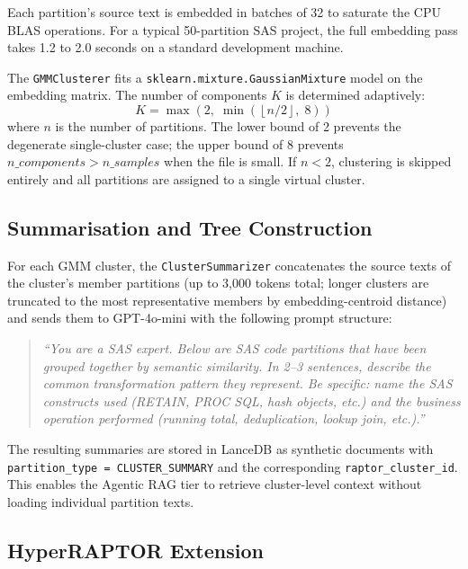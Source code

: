 Each partition's source text is embedded in batches of 32 to saturate the CPU
BLAS operations. For a typical 50-partition SAS project, the full embedding pass
takes 1.2 to 2.0 seconds on a standard development machine.

The \texttt{GMMClusterer} fits a \texttt{sklearn.mixture.GaussianMixture}
model on the embedding matrix. The number of components $K$ is determined
adaptively:
\begin{equation}
  K = \max\!\left(2,\; \min\!\left(\left\lfloor n / 2 \right\rfloor,\; 8\right)\right)
  \label{eq:gmm-k}
\end{equation}
where $n$ is the number of partitions. The lower bound of 2 prevents the
degenerate single-cluster case; the upper bound of 8 prevents
$n\_components > n\_samples$ when the file is small. If $n < 2$, clustering
is skipped entirely and all partitions are assigned to a single virtual cluster.

\subsection{Summarisation and Tree Construction}
\label{subsec:summarizer-impl}

For each GMM cluster, the \texttt{ClusterSummarizer} concatenates the source
texts of the cluster's member partitions (up to 3,000 tokens total; longer
clusters are truncated to the most representative members by embedding-centroid
distance) and sends them to GPT-4o-mini with the following prompt structure:

\begin{quotation}
\textit{``You are a SAS expert. Below are SAS code partitions that have been
grouped together by semantic similarity. In 2--3 sentences, describe the common
transformation pattern they represent. Be specific: name the SAS constructs
used (RETAIN, PROC SQL, hash objects, etc.) and the business operation performed
(running total, deduplication, lookup join, etc.).''}
\end{quotation}

The resulting summaries are stored in LanceDB as synthetic documents with
\texttt{partition\_type = CLUSTER\_SUMMARY} and the corresponding
\texttt{raptor\_cluster\_id}. This enables the Agentic RAG tier to retrieve
cluster-level context without loading individual partition texts.

\subsection{HyperRAPTOR Extension}
\label{subsec:hyperraptor-impl}

